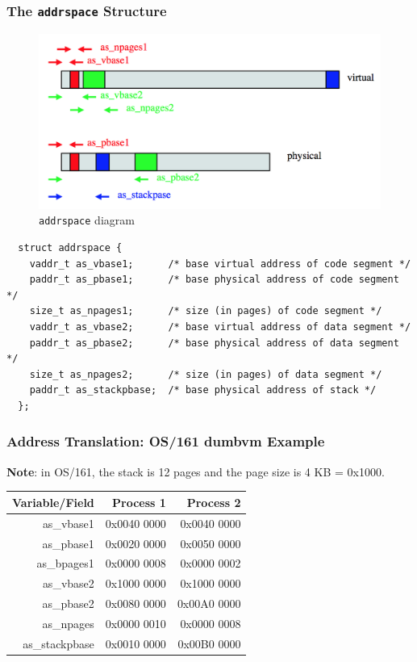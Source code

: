 \documentclass[12pt]{article}
\theoremstyle{plain}
\theoremstyle{definition}
\begin{document}
\subsubsection{The \texttt{addrspace} Structure}
\begin{figure}[ht]
  \centering
  \includegraphics[scale=0.7]{pictures/addrspace.png}
  \caption{\texttt{addrspace} diagram}
  \label{fig:addrspace}
\end{figure}
\begin{verbatim}
  struct addrspace {
    vaddr_t as_vbase1;      /* base virtual address of code segment */
    paddr_t as_pbase1;      /* base physical address of code segment */
    size_t as_npages1;      /* size (in pages) of code segment */
    vaddr_t as_vbase2;      /* base virtual address of data segment */
    paddr_t as_pbase2;      /* base physical address of data segment */
    size_t as_npages2;      /* size (in pages) of data segment */
    paddr_t as_stackpbase;  /* base physical address of stack */
  };
\end{verbatim}

\subsubsection{Address Translation: OS/161 dumbvm Example}
\textbf{Note}: in OS/161, the stack is 12 pages and the page size is 4 KB = 0x1000. \\
\begin{table}
  \centering
  \begin{tabular}{|r|r|r|}
  \hline
  Variable/Field & Process 1 & Process 2 \\ \hline \hline
  as\_vbase1 & 0x0040 0000 & 0x0040 0000 \\ \hline
  as\_pbase1 & 0x0020 0000 & 0x0050 0000 \\ \hline
  as\_bpages1 & 0x0000 0008 & 0x0000 0002 \\ \hline
  as\_vbase2 & 0x1000 0000 & 0x1000 0000 \\ \hline
  as\_pbase2 & 0x0080 0000 & 0x00A0 0000 \\ \hline
  as\_npages & 0x0000 0010 & 0x0000 0008 \\ \hline
  as\_stackpbase & 0x0010 0000 & 0x00B0 0000 \\ \hline
  \end{tabular}
\end{table}
\end{document}
